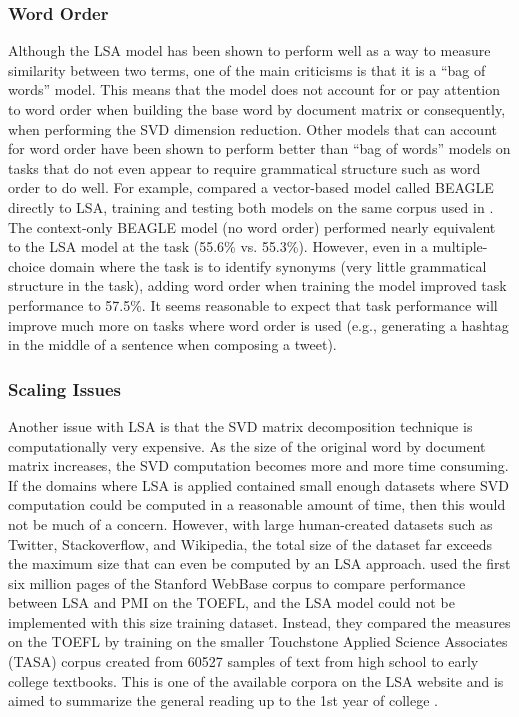 \documentclass[man,floatsintext,donotrepeattitle]{apa6}
\begin{document}
\subsubsection{Word Order}

Although the LSA model has been shown to perform well as a way to measure similarity between two terms, one of the main criticisms is that it is a ``bag of words'' model.
This means that the model does not account for or pay attention to word order when building the base word by document matrix or consequently, when performing the SVD dimension reduction.
Other models that can account for word order have been shown to perform better than ``bag of words'' models on tasks that do not even appear to require grammatical structure such as word order to do well.
For example, \textcite{Jones2007} compared a vector-based model called BEAGLE directly to LSA, training and testing both models on the same corpus used in \textcite{Landauer1997}.
The context-only BEAGLE model (no word order) performed nearly equivalent to the LSA model at the task (55.6\% vs. 55.3\%).
However, even in a multiple-choice domain where the task is to identify synonyms (very little grammatical structure in the task), adding word order when training the model improved task performance to 57.5\%.
It seems reasonable to expect that task performance will improve much more on tasks where word order is used (e.g., generating a hashtag in the middle of a sentence when composing a tweet).

\subsubsection{Scaling Issues}

Another issue with LSA is that the SVD matrix decomposition technique is computationally very expensive.
As the size of the original word by document matrix increases, the SVD computation becomes more and more time consuming.
If the domains where LSA is applied contained small enough datasets where SVD computation could be computed in a reasonable amount of time, then this would not be much of a concern.
However, with large human-created datasets such as Twitter, Stackoverflow, and Wikipedia, the total size of the dataset far exceeds the maximum size that can even be computed by an LSA approach.
\textcite{Budiu2007} used the first six million pages of the Stanford WebBase corpus to compare performance between LSA and PMI on the TOEFL, and the LSA model could not be implemented with this size training dataset.
Instead, they compared the measures on the TOEFL by training on the smaller Touchstone Applied Science Associates (TASA) corpus created from \num{60527} samples of text from high school to early college textbooks.
This is one of the available corpora on the LSA website and is aimed to summarize the general reading up to the 1st year of college \parencite{Budiu2007}.
\end{document}
